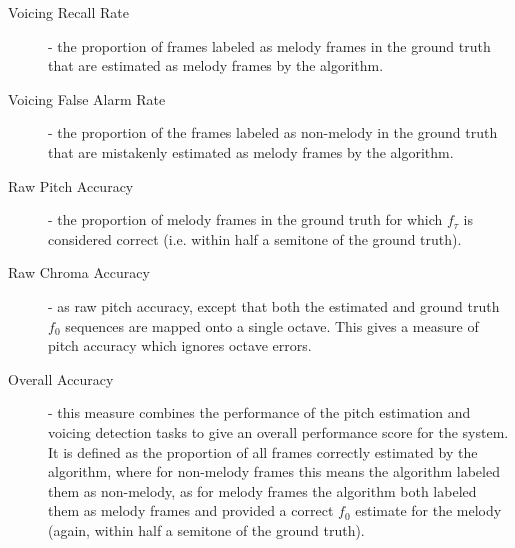 \begin{description}
\item[Voicing Recall Rate] - the proportion of frames labeled as melody frames in the ground truth that are estimated as melody frames by the algorithm.
\item[Voicing False Alarm Rate] - the proportion of the frames labeled as non-melody in the ground truth that are mistakenly estimated as melody frames by the algorithm.
\item[Raw Pitch Accuracy] - the proportion of melody frames in the ground truth for which $f_{\tau}$ is considered correct (i.e. within half a semitone of the ground truth). 
\item[Raw Chroma Accuracy] - as raw pitch accuracy, except that both the estimated and ground truth $f_{0}$ sequences are mapped onto a single octave. This gives a measure of pitch accuracy which ignores octave errors.
\item[Overall Accuracy] - this measure combines the performance of the pitch estimation and voicing detection tasks to give an overall performance score for the system. It is defined as the proportion of all frames correctly estimated by the algorithm, where for non-melody frames this means the algorithm labeled them as non-melody, as for melody frames the algorithm both labeled them as melody frames and provided a correct $f_{0}$ estimate for the melody (again, within half a semitone of the ground truth).
\end{description}


